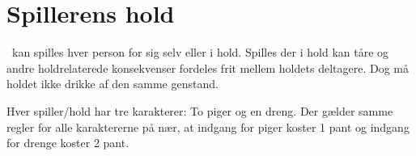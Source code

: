 \section{Spillerens hold}
\LeClub\ kan spilles hver person for sig selv eller i hold. Spilles der i hold kan tåre og andre holdrelaterede konsekvenser fordeles frit mellem holdets deltagere. Dog må holdet ikke drikke af den samme genstand.

Hver spiller/hold har tre karakterer: To piger og en dreng. Der gælder samme regler for alle karaktererne på nær, at indgang for piger koster 1 pant og indgang for drenge koster 2 pant.